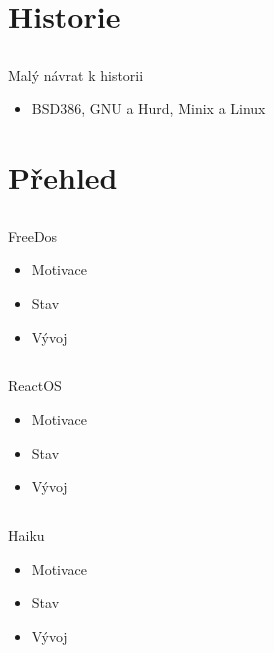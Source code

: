 \documentclass{beamer}
\begin{document}
\section{Historie}

\subsection{}
\begin{frame}{Malý návrat k historii}
\begin{itemize}
\item BSD386, GNU a Hurd, Minix a Linux
\end{itemize}
\end{frame}


\section{Přehled}

\subsection{}
\begin{frame}{FreeDos}
\begin{itemize}
\item Motivace
\item Stav
\item Vývoj
\end{itemize}
\end{frame}

\subsection{}
\begin{frame}{ReactOS}
\begin{itemize}
\item Motivace
\item Stav
\item Vývoj
\end{itemize}
\end{frame}

\subsection{}
\begin{frame}{Haiku}
\begin{itemize}
\item Motivace
\item Stav
\item Vývoj
\end{itemize}
\end{frame}
\end{document}
